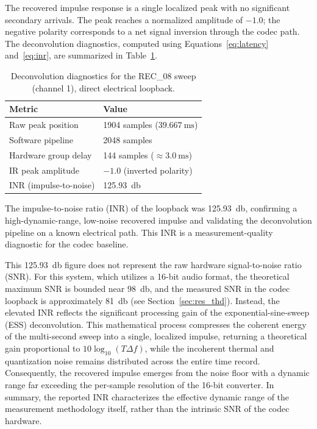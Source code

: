 The recovered impulse response is a single localized peak with no significant secondary arrivals. The peak reaches a normalized amplitude of $-1.0$; the negative polarity corresponds to a net signal inversion through the codec path. The deconvolution diagnostics, computed using Equations~\eqref{eq:latency} and~\eqref{eq:inr}, are summarized in Table~\ref{tab:ir_metrics}.

\begin{table}[h!]
  \centering
  \begin{tabular}{ll}
    \toprule
    \textbf{Metric} & \textbf{Value} \\
    \midrule
    Raw peak position      & 1904 samples ($\SI{39.667}{\ms}$) \\
    Software pipeline      & 2048 samples \\
    Hardware group delay   & 144 samples ($\approx\SI{3.0}{\ms}$) \\
    IR peak amplitude      & $-1.0$ (inverted polarity) \\
    INR (impulse-to-noise) & \SI{125.93}{\decibel} \\
    \bottomrule
  \end{tabular}
  \caption{Deconvolution diagnostics for the REC\_08 sweep (channel 1), direct electrical loopback.}
  \label{tab:ir_metrics}
\end{table}

The impulse-to-noise ratio (INR) of the loopback was \SI{125.93}{\decibel}, confirming a high-dynamic-range, low-noise recovered impulse and validating the deconvolution pipeline on a known electrical path. This INR is a measurement-quality diagnostic for the codec baseline.

This \SI{125.93}{\decibel} figure does not represent the raw hardware signal-to-noise ratio (SNR). For this system, which utilizes a 16-bit audio format, the theoretical maximum SNR is bounded near \SI{98}{\decibel}, and the measured SNR in the codec loopback is approximately \SI{81}{\decibel} (see Section~\ref{sec:res_thd}). Instead, the elevated INR reflects the significant processing gain of the exponential-sine-sweep (ESS) deconvolution. This mathematical process compresses the coherent energy of the multi-second sweep into a single, localized impulse, returning a theoretical gain proportional to $10\log_{10}(T\Delta f)$, while the incoherent thermal and quantization noise remains distributed across the entire time record. Consequently, the recovered impulse emerges from the noise floor with a dynamic range far exceeding the per-sample resolution of the 16-bit converter. In summary, the reported INR characterizes the effective dynamic range of the measurement methodology itself, rather than the intrinsic SNR of the codec hardware.

